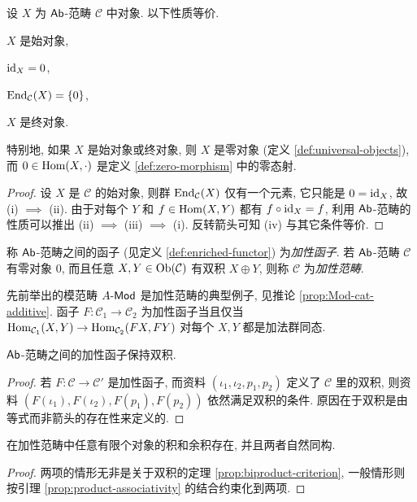 \begin{lemma}
	设 $X$ 为 $\mathsf{Ab}$-范畴 $\mathcal{C}$ 中对象. 以下性质等价.
	\begin{compactenum}[(i)]
		\item $X$ 是始对象,
		\item $\mathrm{id}_X = 0$,
		\item $\operatorname{End}_{\mathcal{C}}(X) = \{0\}$,
		\item $X$ 是终对象.
	\end{compactenum}
	特别地, 如果 $X$ 是始对象或终对象, 则 $X$ 是零对象 (定义 \ref{def:universal-objects}), 而 $0 \in \operatorname{Hom}(X, \cdot)$ 是定义 \ref{def:zero-morphism} 中的零态射.
\end{lemma}
\begin{proof}
	设 $X$ 是 $\mathcal{C}$ 的始对象, 则群 $\operatorname{End}_{\mathcal{C}}(X)$ 仅有一个元素, 它只能是 $0 = \mathrm{id}_X$, 故 (i) $\implies$ (ii). 由于对每个 $Y$ 和 $f \in \operatorname{Hom}(X, Y)$ 都有 $f \circ \mathrm{id}_X = f$, 利用 $\mathsf{Ab}$-范畴的性质可以推出 (ii) $\implies$ (iii) $\implies$ (i). 反转箭头可知 (iv) 与其它条件等价.
\end{proof}

\begin{definition}[加性函子与加性范畴]\label{def:additive-cat}
	称 $\mathsf{Ab}$-范畴之间的函子 (见定义 \ref{def:enriched-functor}) 为\emph{加性函子}. 若 $\mathsf{Ab}$-范畴 $\mathcal{C}$ 有零对象 $0$, 而且任意 $X, Y \in \operatorname{Ob}(\mathcal{C})$ 有双积 $X \oplus Y$, 则称 $\mathcal{C}$ 为\emph{加性范畴}. 
\end{definition}

先前举出的模范畴 $A\text{-}\mathsf{Mod}$ 是加性范畴的典型例子, 见推论 \ref{prop:Mod-cat-additive}. 函子 $F: \mathcal{C}_1 \to \mathcal{C}_2$ 为加性函子当且仅当 $\operatorname{Hom}_{\mathcal{C}_1}(X, Y) \to \operatorname{Hom}_{\mathcal{C}_2}(FX, FY)$ 对每个 $X, Y$ 都是加法群同态.

\begin{proposition}\label{prop:biproduct-preservation}
	$\mathsf{Ab}$-范畴之间的加性函子保持双积.
\end{proposition}
\begin{proof}
	若 $F: \mathcal{C} \to \mathcal{C}'$ 是加性函子, 而资料 $(\iota_1, \iota_2, p_1, p_2)$ 定义了 $\mathcal{C}$ 里的双积, 则资料 $(F(\iota_1), F(\iota_2), F(p_1), F(p_2))$ 依然满足双积的条件. 原因在于双积是由等式而非箭头的存在性来定义的.
\end{proof}

\begin{proposition}\label{prop:additive-prod-coprod}
	在加性范畴中任意有限个对象的积和余积存在, 并且两者自然同构.
\end{proposition}
\begin{proof}
	两项的情形无非是关于双积的定理 \ref{prop:biproduct-criterion}, 一般情形则按引理 \ref{prop:product-associativity} 的结合约束化到两项.
\end{proof}

